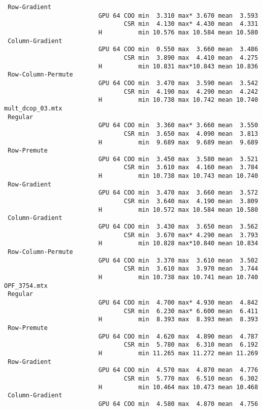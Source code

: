 {\begin{verbatim}
 Row-Gradient
                          GPU 64 COO min  3.310 max* 3.670 mean  3.593
                                 CSR min  4.130 max* 4.430 mean  4.331
                          H          min 10.576 max 10.584 mean 10.580
 Column-Gradient
                          GPU 64 COO min  0.550 max  3.660 mean  3.486
                                 CSR min  3.890 max  4.410 mean  4.275
                          H          min 10.831 max*10.843 mean 10.836
 Row-Column-Permute
                          GPU 64 COO min  3.470 max  3.590 mean  3.542
                                 CSR min  4.190 max  4.290 mean  4.242
                          H          min 10.738 max 10.742 mean 10.740
mult_dcop_03.mtx
 Regular
                          GPU 64 COO min  3.360 max* 3.660 mean  3.550
                                 CSR min  3.650 max  4.090 mean  3.813
                          H          min  9.689 max  9.689 mean  9.689
 Row-Premute
                          GPU 64 COO min  3.450 max  3.580 mean  3.521
                                 CSR min  3.610 max  4.160 mean  3.784
                          H          min 10.738 max 10.743 mean 10.740
 Row-Gradient
                          GPU 64 COO min  3.470 max  3.660 mean  3.572
                                 CSR min  3.640 max  4.190 mean  3.809
                          H          min 10.572 max 10.584 mean 10.580
 Column-Gradient
                          GPU 64 COO min  3.430 max  3.650 mean  3.562
                                 CSR min  3.670 max* 4.290 mean  3.793
                          H          min 10.828 max*10.840 mean 10.834
 Row-Column-Permute
                          GPU 64 COO min  3.370 max  3.610 mean  3.502
                                 CSR min  3.610 max  3.970 mean  3.744
                          H          min 10.738 max 10.741 mean 10.740
OPF_3754.mtx
 Regular
                          GPU 64 COO min  4.700 max* 4.930 mean  4.842
                                 CSR min  6.230 max* 6.600 mean  6.411
                          H          min  8.393 max  8.393 mean  8.393
 Row-Premute
                          GPU 64 COO min  4.620 max  4.890 mean  4.787
                                 CSR min  5.780 max  6.310 mean  6.192
                          H          min 11.265 max 11.272 mean 11.269
 Row-Gradient
                          GPU 64 COO min  4.570 max  4.870 mean  4.776
                                 CSR min  5.770 max  6.510 mean  6.302
                          H          min 10.464 max 10.473 mean 10.468
 Column-Gradient
                          GPU 64 COO min  4.580 max  4.870 mean  4.756

\end{verbatim}}
